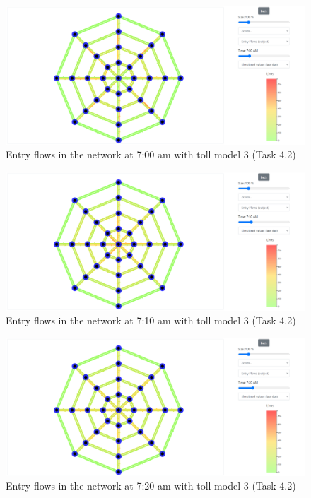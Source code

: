 \documentclass[a4paper, 12pt,oneside]{article}
\begin{document}
\begin{minipage}[c]{0.5\textwidth}
\begin{figure}[H]
    \centering
    \includegraphics[width=1\textwidth]{Images/Step4/results_on_network_task4.2_700am.png}
    \caption{Entry flows in the network at 7:00 am with toll model 3 (Task 4.2)}
    \label{fig:Entry flows in the network at 7:00 am with toll model 3 (Task 4.2)}
\end{figure}
\end{minipage}
\begin{minipage}[c]{0.5\textwidth}
\begin{figure}[H]
    \centering
    \includegraphics[width=1\textwidth]{Images/Step4/results_on_network_task4.2_710am.png}
    \caption{Entry flows in the network at 7:10 am with toll model 3 (Task 4.2)}
    \label{fig:Entry flows in the network at 7:10 am with toll model 3 (Task 4.2)}
\end{figure}
\end{minipage}
\begin{minipage}[c]{0.5\textwidth}
\begin{figure}[H]
    \centering
    \includegraphics[width=1\textwidth]{Images/Step4/results_on_network_task4.2_720am.png}
    \caption{Entry flows in the network at 7:20 am with toll model 3 (Task 4.2)}
    \label{fig:Entry flows in the network at 7:20 am with toll model 3 (Task 4.2)}
\end{figure}
\end{minipage}
\end{document}
